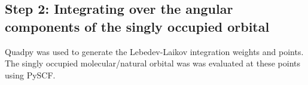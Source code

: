 %
\inputminted{zsh}{parts/cclibmolden.sh}

\subsection{Step 2: Integrating over the angular components of the singly occupied orbital}

Quadpy was used to generate the Lebedev-Laikov integration weights and points.
The singly occupied molecular/natural orbital was was evaluated at these points using PySCF.

%
\inputminted{python}{parts/anionradialint.py}


